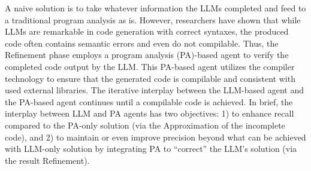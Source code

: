 A naive solution is to take whatever information the LLMs completed
and feed to a traditional program analysis as is. However,
researchers have shown that while LLMs are remarkable in code
generation with correct syntaxes, the produced code often contains
semantic errors and even do not compilable.  Thus, the Refinement
phase employs a program analysis (PA)-based agent to verify the
completed code output by the LLM. This PA-based agent utilizes the
compiler technology to ensure that the generated code is compilable
and consistent with used external libraries. The iterative interplay
between the LLM-based agent and the PA-based agent continues until a
compilable code is achieved.
In brief, the interplay between LLM and PA agents has two objectives:
1) to enhance recall compared to the PA-only solution (via the
Approximation of the incomplete code), and 2) to
maintain or even improve precision beyond what can be achieved with
LLM-only solution by integrating PA to ``correct'' the LLM's solution
(via the result Refinement).








